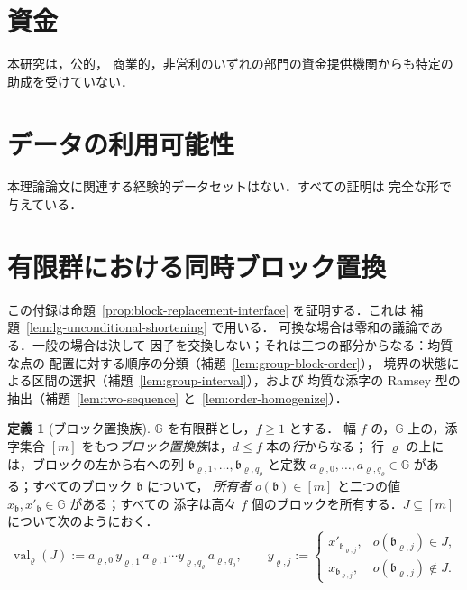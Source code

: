 \documentclass[11pt,a4paper]{ltjsarticle}
\numberwithin{equation}{section}
\theoremstyle{plain}
\theoremstyle{definition}
\newtheorem{definition}[theorem]{定義}
\theoremstyle{remark}
\theoremstyle{plain}
\begin{document}
\section*{資金}
本研究は，公的，
商業的，非営利のいずれの部門の資金提供機関からも特定の助成を受けていない．

\section*{データの利用可能性}
本理論論文に関連する経験的データセットはない．すべての証明は
完全な形で与えている．

\appendix
\section{有限群における同時ブロック置換}
\label{app:group-blocks}

この付録は命題~\ref{prop:block-replacement-interface} を証明する．これは
補題~\ref{lem:lg-unconditional-shortening} で用いる．
可換な場合は零和の議論である．一般の場合は決して
因子を交換しない；それは三つの部分からなる：均質な点の
配置に対する順序の分類（補題~\ref{lem:group-block-order}），
境界の状態による区間の選択（補題~\ref{lem:group-interval}），および
均質な添字の Ramsey 型の抽出（補題~\ref{lem:two-sequence} と~\ref{lem:order-homogenize}）．

\begin{definition}[ブロック置換族]
\label{def:block-family}
${\mathbb G}$ を有限群とし，$f\ge1$ とする．
幅 $f$ の，${\mathbb G}$ 上の，添字集合 $[m]$ をもつ\emph{ブロック置換族}は，$d\le f$ 本の\emph{行}からなる；
行 $\varrho$ の上には，ブロックの左から右への列 $\mathfrak b_{\varrho,1},\ldots,\mathfrak b_{\varrho,q_\varrho}$
と定数 $a_{\varrho,0},\ldots,a_{\varrho,q_\varrho}\in {\mathbb G}$ がある；すべてのブロック $\mathfrak b$ について，
\emph{所有者} $o(\mathfrak b)\in[m]$ と二つの値 $x_{\mathfrak b},x'_{\mathfrak b}\in {\mathbb G}$ がある；すべての
添字は高々 $f$ 個のブロックを所有する．$J\subseteq[m]$ について次のようにおく．
\[
 \operatorname{val}_\varrho(J):=a_{\varrho,0}\,y_{\varrho,1}\,a_{\varrho,1}\cdots y_{\varrho,q_\varrho}\,a_{\varrho,q_\varrho},
 \qquad
 y_{\varrho,j}:=
 \begin{cases}
 x'_{\mathfrak b_{\varrho,j}},& o(\mathfrak b_{\varrho,j})\in J,\\
 x_{\mathfrak b_{\varrho,j}},& o(\mathfrak b_{\varrho,j})\notin J.
 \end{cases}
\]
\end{definition}
\end{document}
